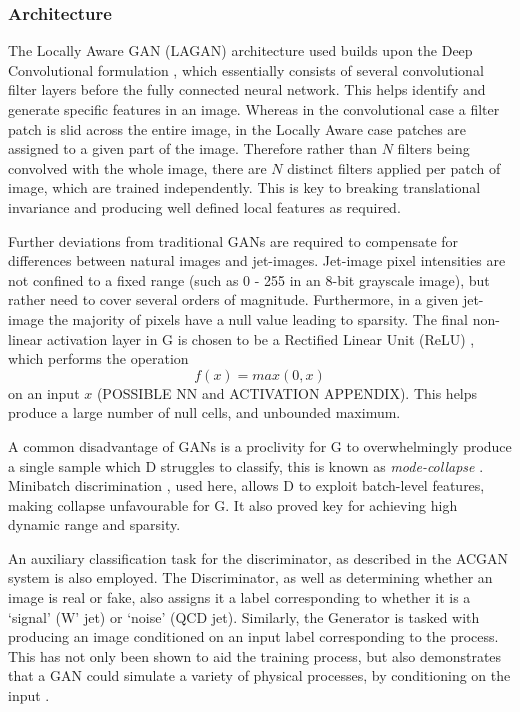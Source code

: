 \documentclass[twocolumn,twoside]{article}
\begin{document}
\subsubsection{Architecture}
The Locally Aware GAN (LAGAN) architecture used builds upon the Deep Convolutional formulation \cite{Radford2015}, which essentially consists of several convolutional filter layers before the fully connected neural network. This helps identify and generate specific features in an image. Whereas in the convolutional case a filter patch is slid across the entire image, in the Locally Aware case patches are assigned to a given part of the image. Therefore rather than $N$ filters being convolved with the whole image, there are $N$ distinct filters applied per patch of image, which are trained independently. This is key to breaking translational invariance and producing well defined local features as required.

Further deviations from traditional GANs are required to compensate for differences between natural images and jet-images. Jet-image pixel intensities are not confined to a fixed range (such as 0 - 255 in an 8-bit grayscale image), but rather need to cover several orders of magnitude. Furthermore, in a given jet-image the majority of pixels have a null value leading to sparsity. The final non-linear activation layer in G is chosen to be a Rectified Linear Unit (ReLU) \cite{relu}, which performs the operation
$$
f(x) = max(0, x)
$$
on an input $x$ (POSSIBLE NN and ACTIVATION APPENDIX). This helps produce a large number of null cells, and unbounded maximum. 

A common disadvantage of GANs is a proclivity for G to overwhelmingly produce a single sample which D struggles to classify, this is known as \textit{mode-collapse} \cite{gan1}. Minibatch discrimination \cite{improvedgan}, used here, allows D to exploit batch-level features, making collapse unfavourable for G. It also proved key for achieving high dynamic range and sparsity.

An auxiliary classification task for the discriminator, as described in the ACGAN system \cite{odena2016conditional} is also employed. The Discriminator, as well as determining whether an image is real or fake, also assigns it a label corresponding to whether it is a `signal' (W' jet) or `noise' (QCD jet). Similarly, the Generator is tasked with producing an image conditioned on an input label corresponding to the process. This has not only been shown to aid the training process, but also demonstrates that a GAN could simulate a variety of physical processes, by conditioning on the input \cite{mirza2014conditional}.
\end{document}
